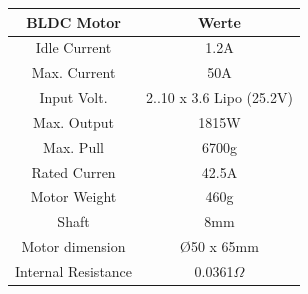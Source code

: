 \begin{center}
	\begin{tabular}{|c|c|}
		\hline 
		\rule[-1ex]{0pt}{2.5ex}  BLDC Motor & Werte  \\ 
		\hline 
		\rule[-1ex]{0pt}{2.5ex} Idle Current & 1.2A \\ 
		\hline 
		\rule[-1ex]{0pt}{2.5ex} Max. Current & 50A \\ 
		\hline
		\rule[-1ex]{0pt}{2.5ex} Input Volt. & 2..10 x 3.6 Lipo (25.2V) \\ 
		\hline
		\rule[-1ex]{0pt}{2.5ex} Max. Output & 1815W \\ 
		\hline
		\rule[-1ex]{0pt}{2.5ex} Max. Pull & 6700g \\ 
		\hline
		\rule[-1ex]{0pt}{2.5ex} Rated Curren & 42.5A \\ 
		\hline
		\rule[-1ex]{0pt}{2.5ex} Motor Weight & 460g \\ 
		\hline
		\rule[-1ex]{0pt}{2.5ex} Shaft & 8mm \\ 
		\hline
		\rule[-1ex]{0pt}{2.5ex} Motor dimension & \O 50 x 65mm \\ 
		\hline
		\rule[-1ex]{0pt}{2.5ex} Internal Resistance & 0.0361$\Omega$ \\ 
		\hline	
	\end{tabular} 
	\label{tabBLDCdaten}
\end{center}






